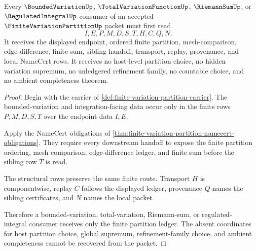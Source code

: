 \begin{theorem}
\label{thm:finite-variation-partition-bounded-variation-handoff}
Every $\BoundedVariationUp$, $\TotalVariationFunctionUp$, $\RiemannSumUp$, or $\RegulatedIntegralUp$ consumer of an accepted $\FiniteVariationPartitionUp$ packet must first read
$$
I,E,P,M,D,S,T,H,C,Q,N.
$$
It receives the displayed endpoint, ordered finite partition, mesh-comparison, edge-difference, finite-sum, sibling handoff, transport, replay, provenance, and local NameCert rows. It receives no host-level partition choice, no hidden variation supremum, no unledgered refinement family, no countable choice, and no ambient completeness theorem.
\end{theorem}
\begin{proof}
Begin with the carrier of \autoref{def:finite-variation-partition-carrier}. The bounded-variation and integration-facing data occur only in the finite rows $P,M,D,S,T$ over the endpoint data $I,E$.

Apply the NameCert obligations of \autoref{thm:finite-variation-partition-namecert-obligations}. They require every downstream handoff to expose the finite partition ordering, mesh comparison, edge-difference ledger, and finite sum before the sibling row $T$ is read.

The structural rows preserve the same finite route. Transport $H$ is componentwise, replay $C$ follows the displayed ledger, provenance $Q$ names the sibling certificates, and $N$ names the local packet.

Therefore a bounded-variation, total-variation, Riemann-sum, or regulated-integral consumer receives only the finite partition ledger. The absent coordinates for host partition choice, global supremum, refinement-family choice, and ambient completeness cannot be recovered from the packet.
\end{proof}


\begin{closurestatus}{\FiniteVariationPartitionUp}
  \theoryclosure{\seedClosure}
  \formalstatus{\unformalizedV}
\end{closurestatus}
